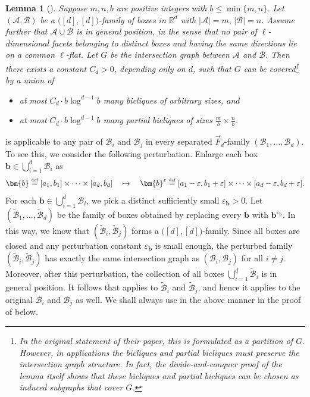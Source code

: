 \documentclass[11pt]{article}
\newtheorem{lemma}[theorem]{Lemma}
\theoremstyle{definition}
\newcommand*{\eqdef}{\stackrel{\mbox{\normalfont\tiny def}}{=}} %
\newcommand*{\veps}{\varepsilon}                                %
\newcommand*{\R}{\mathbb{R}}                                    %
\newcommand*{\vF}{\vec{F}}
\newcommand*{\cB}{\mathcal{B}}
\newcommand*{\cA}{\mathcal{A}}
\begin{document}
\begin{lemma}[{\cite[Lemma 11]{chan_keller_smorodinsky}}] \label{lem:biclique_cover}
    Suppose $m, n, b$ are positive integers with $b \le \min\{m, n\}$. Let $(\cA, \cB)$ be a $\bigl( [d],[d] \bigr)$-family of boxes in $\R^d$ with $|\cA| = m, \, |\cB| = n$. Assume further that $\cA \cup \cB$ is in general position, in the sense that no pair of $\ell$-dimensional facets belonging to distinct boxes and having the same directions lie on a common $\ell$-flat. Let $G$ be the intersection graph between $\cA$ and $\cB$. Then there exists a constant $C_d > 0$, depending only on $d$, such that $G$ can be covered\footnote{In the original statement of their paper, this is formulated as a partition of \(G\). However, in applications the bicliques and partial bicliques must preserve the intersection graph structure. In fact, the divide-and-conquer proof of the lemma itself shows that these bicliques and partial bicliques can be chosen as induced subgraphs that cover \(G\).} by a union of
    \vspace{-0.5em}
    \begin{itemize}
        \item at most $C_d \cdot b \log^{d-1} b$ many bicliques of arbitrary sizes, and 
        \vspace{-0.5em}
        \item at most $C_d \cdot b \log^{d-1} b$ many partial bicliques of sizes $\frac{m}{b} \times \frac{n}{b}$. 
    \end{itemize}
    \vspace{-0.5em}
\end{lemma}

 is applicable to any pair of $\cB_i$ and $\cB_j$ in every separated $\vF_d$-family $(\cB_1, \dots, \cB_d)$. To see this, we consider the following perturbation. Enlarge each box $\bm{b} \in \bigcup_{i=1}^d \cB_i$ as 
\[
\bm{b} \eqdef [a_1, b_1] \times \dots \times [a_d, b_d] \quad \mapsto \quad \bm{b}^{\veps} \eqdef [a_1-\veps, b_1+\veps] \times \dots \times [a_d-\veps, b_d+\veps]. 
\]
For each $\bm{b} \in \bigcup_{i=1}^d \cB_i$, we pick a distinct sufficiently small $\veps_{\bm{b}} > 0$. Let $(\widetilde{\cB}_1, \dots, \widetilde{\cB}_d)$ be the family of boxes obtained by replacing every $\bm{b}$ with $\bm{b}^{\veps_{\bm{b}}}$. In this way, we know that $(\widetilde{\cB}_i, \widetilde{\cB}_j)$ forms a $\bigl( [d], [d] \bigr)$-family. Since all boxes are closed and any perturbation constant $\veps_{\bm{b}}$ is small enough, the perturbed family $(\widetilde{\cB}_i, \widetilde{\cB}_j)$ has exactly the same intersection graph as $(\cB_i, \cB_j)$ for all $i\neq j$. Moreover, after this perturbation, the collection of all boxes $\bigcup_{i=1}^d \widetilde{\cB}_i$ is in general position. It follows that  applies to $\widetilde{\cB}_i$ and $\widetilde{\cB}_j$, and hence it applies to the original $\cB_i$ and $\cB_j$ as well. We shall always use  in the above manner in the proof of  below. 
\end{document}
